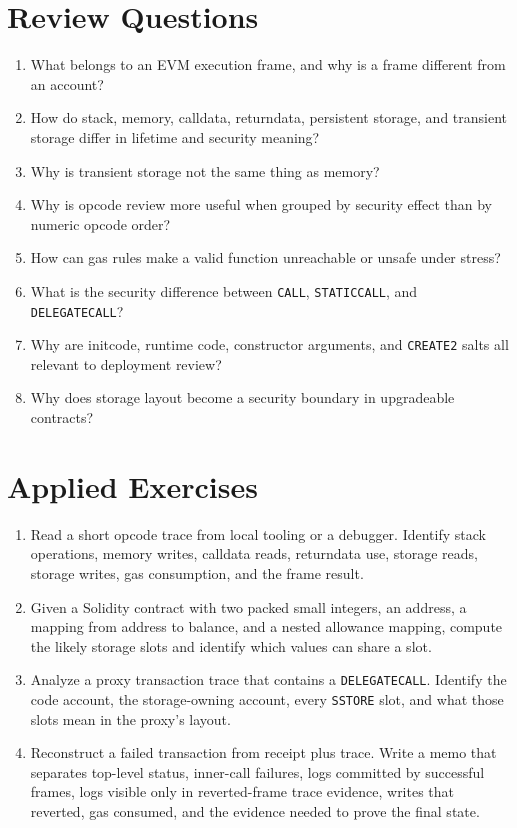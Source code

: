 \section*{Review Questions}

\begin{enumerate}
\item What belongs to an EVM execution frame, and why is a frame different from an account?
\item How do stack, memory, calldata, returndata, persistent storage, and transient storage differ in lifetime and security meaning?
\item Why is transient storage not the same thing as memory?
\item Why is opcode review more useful when grouped by security effect than by numeric opcode order?
\item How can gas rules make a valid function unreachable or unsafe under stress?
\item What is the security difference between \texttt{CALL}, \texttt{STATICCALL}, and \texttt{DELEGATECALL}?
\item Why are initcode, runtime code, constructor arguments, and \texttt{CREATE2} salts all relevant to deployment review?
\item Why does storage layout become a security boundary in upgradeable contracts?
\end{enumerate}

\section*{Applied Exercises}

\begin{enumerate}
\item Read a short opcode trace from local tooling or a debugger. Identify stack operations, memory writes, calldata reads, returndata use, storage reads, storage writes, gas consumption, and the frame result.

\item Given a Solidity contract with two packed small integers, an address, a mapping from address to balance, and a nested allowance mapping, compute the likely storage slots and identify which values can share a slot.

\item Analyze a proxy transaction trace that contains a \texttt{DELEGATECALL}. Identify the code account, the storage-owning account, every \texttt{SSTORE} slot, and what those slots mean in the proxy's layout.

\item Reconstruct a failed transaction from receipt plus trace. Write a memo that separates top-level status, inner-call failures, logs committed by successful frames, logs visible only in reverted-frame trace evidence, writes that reverted, gas consumed, and the evidence needed to prove the final state.
\end{enumerate}
